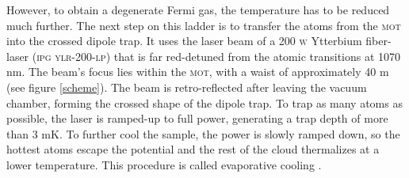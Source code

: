 However, to obtain a degenerate Fermi gas, the temperature has to be reduced much further. The next step on this ladder is to transfer the atoms from the \textsc{mot} into the crossed dipole trap. 
It uses the laser beam of a 200 \textsc{w} Ytterbium fiber-laser (\textsc{ipg ylr-200-lp}) that is far red-detuned from the atomic transitions at 1070 nm. The beam's focus lies within the \textsc{mot}, with a waist of approximately 40 \mu m \cite{lompe} (see figure \ref{scheme}). The beam is retro-reflected after leaving the vacuum chamber, forming the crossed shape of the dipole trap. To trap as many atoms as possible, the laser is ramped-up to full power, generating a trap depth of more than 3 mK. To further cool the sample, the power is slowly ramped down, so the hottest atoms escape the potential and the rest of the cloud thermalizes at a lower temperature. This procedure is called evaporative cooling \cite{metcalf}.

